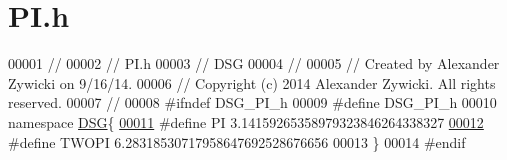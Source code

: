 \hypertarget{_p_i_8h_source}{\section{P\+I.\+h}
\label{_p_i_8h_source}
}

\begin{DoxyCode}
00001 \textcolor{comment}{//}
00002 \textcolor{comment}{//  PI.h}
00003 \textcolor{comment}{//  DSG}
00004 \textcolor{comment}{//}
00005 \textcolor{comment}{//  Created by Alexander Zywicki on 9/16/14.}
00006 \textcolor{comment}{//  Copyright (c) 2014 Alexander Zywicki. All rights reserved.}
00007 \textcolor{comment}{//}
00008 \textcolor{preprocessor}{#ifndef DSG\_PI\_h}
00009 \textcolor{preprocessor}{#define DSG\_PI\_h}
00010 \textcolor{keyword}{namespace }\hyperlink{namespace_d_s_g}{DSG}\{
\hypertarget{_p_i_8h_source_l00011}{}\hyperlink{_p_i_8h_a598a3330b3c21701223ee0ca14316eca}{00011} \textcolor{preprocessor}{#define PI    3.14159265358979323846264338327}
\hypertarget{_p_i_8h_source_l00012}{}\hyperlink{_p_i_8h_a4912c64aec0c943b7985db6cb61ff83a}{00012} \textcolor{preprocessor}{#define TWOPI 6.28318530717958647692528676656}
00013 \}
00014 \textcolor{preprocessor}{#endif}
\end{DoxyCode}
